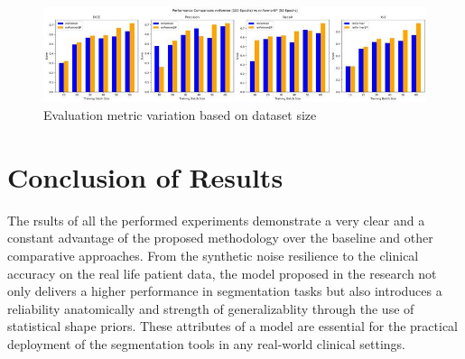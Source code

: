\begin{figure}[htb!] %
\centering
\centering
\includegraphics[width=1\textwidth]{images/datasets.jpeg}
\caption{\centering Evaluation metric variation based on dataset size}
\label{Fig:datasets}
\end{figure}

\section{Conclusion of Results}
The rsults of all the performed experiments demonstrate a very clear and a constant advantage of the proposed methodology over the baseline and other comparative approaches. From the synthetic noise resilience to the clinical accuracy on the real life patient data, the model proposed in the research not only delivers a higher performance in segmentation tasks but also introduces a reliability anatomically and strength of generalizablity through the use of statistical shape priors. These attributes of a model are essential for the practical deployment of the segmentation tools in any real-world clinical settings.
